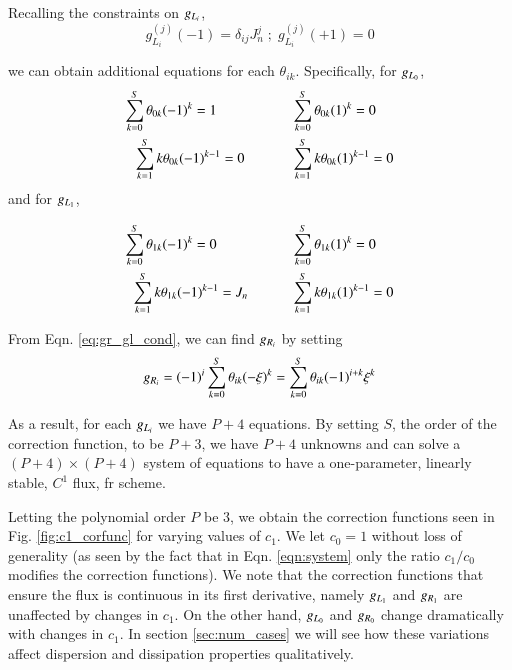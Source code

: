 Recalling the constraints on $\gL$,
\begin{equation}
 g^{(j)}_{L_i}(-1) = \delta_{ij} J_n^j \; ; \;   g^{(j)}_{L_i}(+1) = 0
\end{equation}

we can obtain additional equations for each $\theta_{ik}$. Specifically, for $\gL[0]$,
\begin{equation}
\begin{split}
\sum^S_{k=0} \theta_{0k}(-1)^k = 1\hspace{0.7cm} \text{ \hspace{1cm} }
&\sum^S_{k=0}
\theta_{0k}(1)^k = 0\\
\sum^S_{k=1} k\theta_{0k}(-1)^{k-1} = 0 \text{ \hspace{1cm} } &\sum^S_{k=1}
k\theta_{0k}(1)^{k-1} = 0
\end{split}
\end{equation}
and for $\gL[1]$,

\begin{equation}
\begin{split}
\sum^S_{k=0} \theta_{1k}(-1)^k = 0\hspace{0.7cm} \text{ \hspace{1cm} }
&\sum^S_{k=0}
\theta_{1k}(1)^k = 0\\
\sum^S_{k=1} k\theta_{1k}(-1)^{k-1} = J_n \text{ \hspace{1cm}} & \sum^S_{k=1}
k\theta_{1k}(1)^{k-1} = 0
\end{split}
\end{equation}

From Eqn. \eqref{eq:gr_gl_cond}, we can find $\gR$ by setting
\begin{equation}
\gR = (-1)^i\sum_{k=0}^S \theta_{ik}(-\xi)^k = \sum_{k=0}^S \theta_{ik}(-1)^{i+k}\xi^k
\end{equation}

As a result, for each $\gL$ we have $P+4$ equations. By setting $S$, the order of the correction function, to be $P+3$, we have $P+4$ unknowns and can solve a $(P+4)\times(P+4)$ system of equations to have a one-parameter, linearly stable, $C^{1}$ flux, \gls{fr} scheme.

Letting the polynomial order $P$ be $3$, we obtain the correction functions seen in Fig. \ref{fig:c1_corfunc} for varying values of $c_1$. We let $c_0 = 1$ without loss of generality (as seen by the fact that in Eqn. \eqref{eqn:system} only the ratio $c_1/c_0$ modifies the correction functions). We note that the correction functions that ensure the flux is continuous in its first derivative, namely $\gL[1]$ and $\gR[1]$ are unaffected by changes in $c_1$. On the other hand, $\gL[0]$ and $\gR[0]$ change dramatically with changes in $c_1$. In section \ref{sec:num_cases} we will see how these variations affect dispersion and dissipation properties qualitatively.

